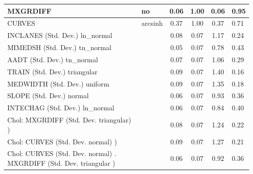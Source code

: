 \begin{table}
\begin{center}
\begin{tabular}{|l|l|c|c|c|l|}
			\hline
			MXGRDIFF & no & 0.06 & 1.00 & 0.06 & 0.95 \\
			\hline
			CURVES & arcsinh & 0.37 & 1.00 & 0.37 & 0.71 \\
			\hline
			INCLANES (Std. Dev.) ln_normal &  & 0.08 & 0.07 & 1.17 & 0.24 \\
			\hline
			MIMEDSH (Std. Dev.) tn_normal &  & 0.05 & 0.07 & 0.78 & 0.43 \\
			\hline
			AADT (Std. Dev.) tn_normal &  & 0.07 & 0.07 & 1.06 & 0.29 \\
			\hline
			TRAIN (Std. Dev.) triangular &  & 0.09 & 0.07 & 1.40 & 0.16 \\
			\hline
			MEDWIDTH (Std. Dev.) uniform &  & 0.09 & 0.07 & 1.35 & 0.18 \\
			\hline
			SLOPE (Std. Dev.) normal &  & 0.06 & 0.07 & 0.93 & 0.36 \\
			\hline
			INTECHAG (Std. Dev.) ln_normal &  & 0.06 & 0.07 & 0.84 & 0.40 \\
			\hline
			 Chol: MXGRDIFF (Std. Dev. triangular) ) &  & 0.08 & 0.07 & 1.24 & 0.22 \\
			\hline
			 Chol: CURVES (Std. Dev. normal) ) &  & 0.09 & 0.07 & 1.27 & 0.21 \\
			\hline
			 Chol: CURVES (Std. Dev. normal) . MXGRDIFF (Std. Dev.   triangular ) &  & 0.06 & 0.07 & 0.92 & 0.36 \\
			\hline
		\end{tabular}
	\end{center}
\end{table}